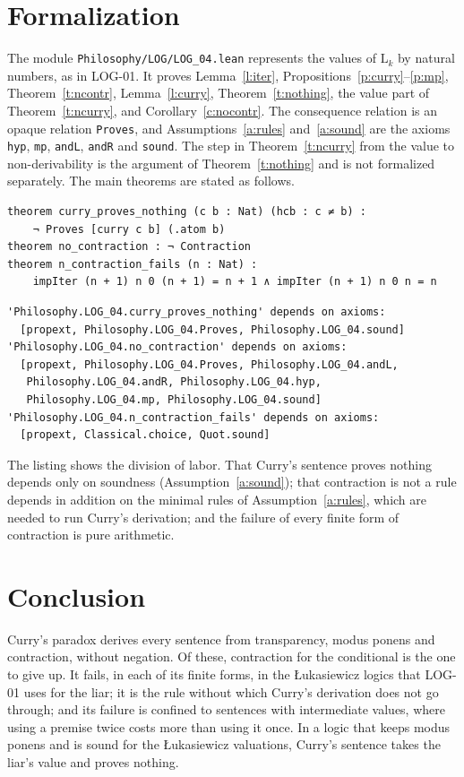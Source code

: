\documentclass{situationist-preprint}
\begin{document}
\section{Formalization}

The module \nolinkurl{Philosophy/LOG/LOG_04.lean} represents the values of $\mathrm{L}_k$ by natural numbers, as in LOG-01. It proves Lemma~\ref{l:iter}, Propositions~\ref{p:curry}--\ref{p:mp}, Theorem~\ref{t:ncontr}, Lemma~\ref{l:curry}, Theorem~\ref{t:nothing}, the value part of Theorem~\ref{t:ncurry}, and Corollary~\ref{c:nocontr}. The consequence relation is an opaque relation \texttt{Proves}, and Assumptions~\ref{a:rules} and~\ref{a:sound} are the axioms \texttt{hyp}, \texttt{mp}, \texttt{andL}, \texttt{andR} and \texttt{sound}. The step in Theorem~\ref{t:ncurry} from the value to non-derivability is the argument of Theorem~\ref{t:nothing} and is not formalized separately. The main theorems are stated as follows.

\begin{lstlisting}
theorem curry_proves_nothing (c b : Nat) (hcb : c ≠ b) :
    ¬ Proves [curry c b] (.atom b)
theorem no_contraction : ¬ Contraction
theorem n_contraction_fails (n : Nat) :
    impIter (n + 1) n 0 (n + 1) = n + 1 ∧ impIter (n + 1) n 0 n = n
\end{lstlisting}

\begin{lstlisting}
'Philosophy.LOG_04.curry_proves_nothing' depends on axioms:
  [propext, Philosophy.LOG_04.Proves, Philosophy.LOG_04.sound]
'Philosophy.LOG_04.no_contraction' depends on axioms:
  [propext, Philosophy.LOG_04.Proves, Philosophy.LOG_04.andL,
   Philosophy.LOG_04.andR, Philosophy.LOG_04.hyp,
   Philosophy.LOG_04.mp, Philosophy.LOG_04.sound]
'Philosophy.LOG_04.n_contraction_fails' depends on axioms:
  [propext, Classical.choice, Quot.sound]
\end{lstlisting}

The listing shows the division of labor. That Curry's sentence proves nothing depends only on soundness (Assumption~\ref{a:sound}); that contraction is not a rule depends in addition on the minimal rules of Assumption~\ref{a:rules}, which are needed to run Curry's derivation; and the failure of every finite form of contraction is pure arithmetic.

\section{Conclusion}

Curry's paradox derives every sentence from transparency, modus ponens and contraction, without negation. Of these, contraction for the conditional is the one to give up. It fails, in each of its finite forms, in the Łukasiewicz logics that LOG-01 uses for the liar; it is the rule without which Curry's derivation does not go through; and its failure is confined to sentences with intermediate values, where using a premise twice costs more than using it once. In a logic that keeps modus ponens and is sound for the Łukasiewicz valuations, Curry's sentence takes the liar's value and proves nothing.
\end{document}
